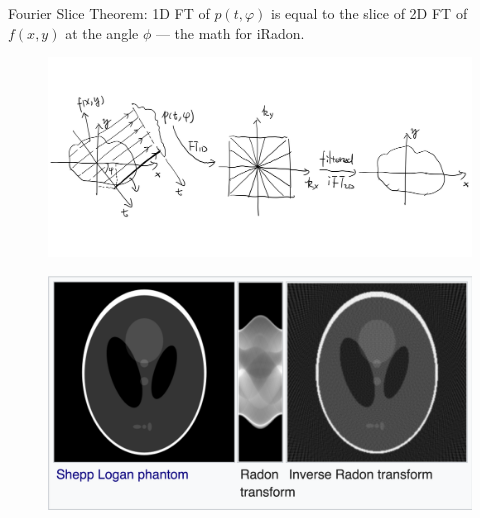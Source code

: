 \documentclass[slidestop,compress,12pt]{beamer}
\begin{document}
\begin{frame}
    Fourier Slice Theorem: 1D FT of $p(t,\varphi)$ is equal to the slice of 2D FT of $f(x,y)$ at the angle $\phi$ --- the math for iRadon.
    \vspace{-0.23cm}
    \begin{figure}
        \includegraphics[scale=0.15]{imgs/iradon.jpg}
    \end{figure}

\end{frame}

\begin{frame}
    \begin{figure}
        \includegraphics[scale=0.35]{imgs/eg3.png}
    \end{figure}
\end{frame}
\end{document}
